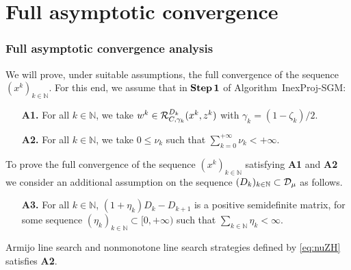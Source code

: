 \section{Full asymptotic convergence}


\begin{frame}[t]\frametitle{Full asymptotic convergence analysis}
  We will prove, under suitable assumptions, the full convergence of the  sequence $(x^k)_{k\in\mathbb{N}}$.  For this end,  we   assume  that in ${\bf Step\,1}$  of  Algorithm~InexProj-SGM:
  \begin{itemize}
    \item[{\bf A1.}] For all $k \in \mathbb{N}$, we take   $w^k \in   {\cal R}_{C,\gamma_k}^{D_k}(x^{k}, z^k)$   with $\gamma_k=(1-\zeta_k)/2$.
      \item[{\bf A2.}]For all $k \in \mathbb{N}$,  we take  $0\leq \nu_{k}$ such that  $\sum_{k=0}^{+\infty} \nu_k<+\infty$.
  \end{itemize}

  \bigskip

  To  prove  the full convergence of the  sequence  $(x^k)_{k\in\mathbb{N}}$ satisfying {\bf A1} and {\bf A2} we consider an additional assumption on the sequence $(D_k)_{k\in {\mathbb N}}\subset {\cal D}_{\mu}$ as follows.
  \begin{itemize}
    \item[{\bf A3.}] For all $k \in \mathbb{N}$,   $(1+\eta_k)D_k-  D_{k+1}$ is  a positive semidefinite matrix, for some sequence $(\eta_k)_{k\in\mathbb{N}}\subset [0, +\infty)$ such that $\sum_{k\in \mathbb{N}}\eta_k<\infty$.
  \end{itemize}

  \bigskip

  Armijo line search and nonmonotone line search strategies defined by \eqref{eq:nuZH} satisfies {\bf A2}.
\end{frame}



